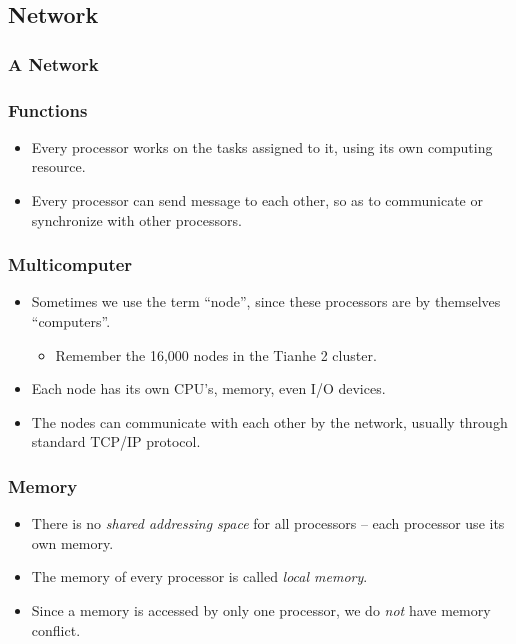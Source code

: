 \documentclass{beamer}
\begin{document}
\begin{CJK}{UTF8}{bsmi}
\subsection{Network}

\begin{frame}
\frametitle{A Network}
\centerline{}
\end{frame}

\begin{frame}
\frametitle{Functions} 
\begin{itemize}
\item Every processor works on the tasks assigned to it, using its own
  computing resource.
\item Every processor can send message to each other, so as to
  communicate or synchronize with other processors.
\end{itemize}
\end{frame}

\begin{frame}
\frametitle{Multicomputer}
\begin{itemize}
\item Sometimes we use the term ``node'', since these processors are
  by themselves ``computers''.
  \begin{itemize}
    \item Remember the 16,000 nodes in the Tianhe 2 cluster.
  \end{itemize}
\item Each node has its own CPU's, memory, even I/O devices.
\item The nodes can communicate with each other by the network, usually
  through standard TCP/IP protocol.
\end{itemize}
\end{frame}


\begin{frame}
\frametitle{Memory}
\begin{itemize}
\item There is no {\em shared addressing space} for all processors --
  each processor use its own memory.
\item The memory of every processor is called {\em local memory}.
\item Since a memory is accessed by only one processor, we do {\em
  not} have memory conflict.
\end{itemize}
\end{frame}


\end{CJK}
\end{document}

